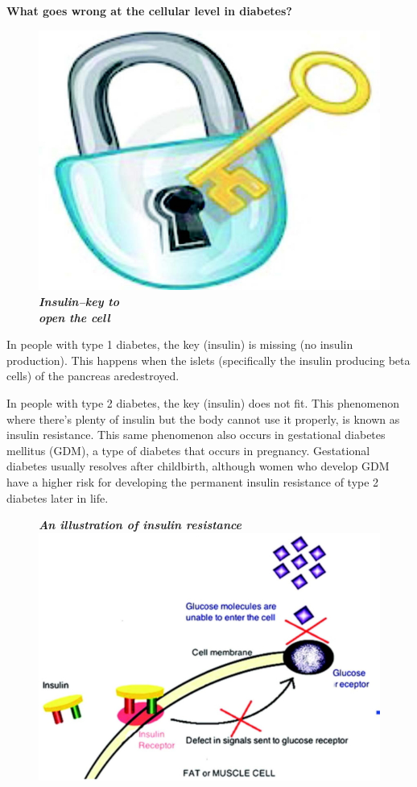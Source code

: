 \noindent
\textbf{What goes wrong at the cellular level in diabetes?}

\begin{figure}
\centering
\includegraphics[scale=.6]{images/020.jpg}\\
\textbf{\textit{Insulin–key to\\ open the cell}}
\end{figure}

In people with type 1 diabetes, the key (insu\-lin) is missing (no insulin produ\-ction). This happens when the islets (specifically the insu\-lin producing beta cells) of the pancreas are\break destroyed.

In people with type 2 diabetes, the key (insu\-lin) does not fit. This phenomenon where there’s plenty of insu\-lin but the body cannot use it pro\-perly, is known as insulin resistance. This same pheno\-menon also occurs in gestational diabetes mellitus (GDM), a type of diabetes that occurs in pregnancy. Gestational diabetes usually resolves after childbirth, although women who develop GDM have a higher risk for developing the permanent insulin resistance of type 2 diabetes later in life.

\begin{figure}[h]
\centering
\textbf{\textit{An illustration of insulin resistance}}
\includegraphics[scale=1.3]{images/021.jpg}
\end{figure}

